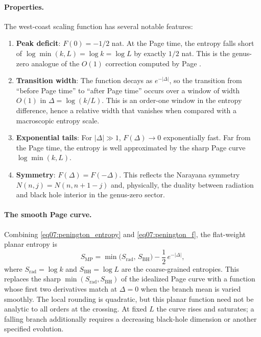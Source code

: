 \documentclass[11pt,letterpaper]{article}
\theoremstyle{plain}
\theoremstyle{definition}
\theoremstyle{remark}
\begin{document}
\paragraph{Properties.}
The west-coast scaling function has several notable features:
\begin{enumerate}
  \item \textbf{Peak deficit}: $F(0) = -1/2$ nat.  At the Page time,
    the entropy falls short of $\log\min(k,L) = \log k = \log L$ by
    exactly $1/2$ nat.  This is the genus-zero analogue of the
    $O(1)$ correction computed by Page \cite{page1993}.

  \item \textbf{Transition width}: The function decays as
    $e^{-|\Delta|}$, so the transition from ``before Page time'' to
    ``after Page time'' occurs over a window of width $O(1)$ in
    $\Delta = \log(k/L)$.  This is an order-one window in the entropy difference, hence a relative
    width that vanishes when compared with a macroscopic entropy scale.

  \item \textbf{Exponential tails}: For $|\Delta| \gg 1$,
    $F(\Delta) \to 0$ exponentially fast.  Far from the Page time, the
    entropy is well approximated by the sharp Page curve
    $\log\min(k,L)$.

  \item \textbf{Symmetry}: $F(\Delta) = F(-\Delta)$.  This reflects the
    Narayana symmetry $N(n,j) = N(n,n+1-j)$ and, physically, the
    duality between radiation and black hole interior in the genus-zero
    sector.
\end{enumerate}

\paragraph{The smooth Page curve.}
Combining \eqref{eq07:penington_entropy} and \eqref{eq07:penington_f},
the flat-weight planar entropy is
\begin{equation}
  S_{\mathrm{MP}}
  = \min\bigl(S_{\mathrm{rad}},\, S_{\mathrm{BH}}\bigr)
    - \frac{1}{2}\, e^{-|\Delta|},
  \label{eq07:smooth_page_curve}
\end{equation}
where $S_{\mathrm{rad}} = \log k$ and $S_{\mathrm{BH}} = \log L$ are
the coarse-grained entropies.  This replaces the sharp
$\min(S_{\mathrm{rad}}, S_{\mathrm{BH}})$ of the idealized Page curve
with a function whose first two derivatives match at $\Delta=0$ when
the branch mean is varied smoothly.  The local rounding is quadratic, but
this planar function need not be analytic to all orders at the crossing.
At fixed $L$ the curve rises and saturates; a falling branch additionally
requires a decreasing black-hole dimension or another specified evolution.
\end{document}
